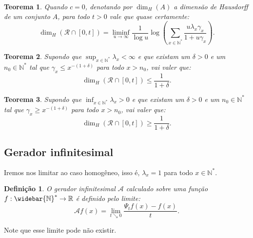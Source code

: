 \documentclass[xcolor=pdftex,dvipsnames]{beamer}
\newcommand{\AAA}{{\mathcal{A}}}
\newcommand{\RR}{{\mathcal{R}}}
\newcommand{\Nz}{{\mathbb{N^*}}}
\newcommand{\Nzb}{{\mathbb{\widebar{N}^*}}}
\newcommand{\R}{{\mathbb{R}}}
\newtheorem{teorema}{Teorema}
\newtheorem{definicao}{Definição}
\begin{document}
\begin{frame}
  \begin{teorema}
    Quando $c = 0$, denotando por $\dim_H (A)$ a dimensão de Hausdorff
    de um conjunto $A$, para todo $t > 0$ vale que quase certamente:
    \begin{displaymath}
      \dim_H(\RR \cap [0, t]) = 
      \liminf_{u \to \infty} 
      \frac{1}{\log u} \log \left(
        \sum_{x \in \Nz} \frac{u \lambda_x \gamma_x}{1 + u\gamma_x}
      \right).
    \end{displaymath}
  \end{teorema}
\end{frame}

\begin{frame}

  \begin{teorema}
    Supondo que $\sup_{x\in\Nz}\lambda_x < \infty$ e que existam um
    $\delta>0$ e um $n_0 \in \Nz$ tal que $\gamma_x \leq
    x^{-(1+\delta)}$ para todo $x > n_0$, vai valer que:
    \begin{displaymath}
      \dim_H(\RR \cap [0, t]) \leq \frac{1}{1+\delta} .
    \end{displaymath}
  \end{teorema}

  \begin{teorema}
    Supondo que $\inf_{x\in\Nz}\lambda_x > 0$ e que existam um
    $\delta>0$ e um $n_0 \in \Nz$ tal que $\gamma_x \geq
    x^{-(1+\delta)}$ para todo $x > n_0$, vai valer que:
    \begin{displaymath}
      \dim_H(\RR \cap [0, t]) \geq \frac{1}{1+\delta} .
    \end{displaymath}
  \end{teorema}
\end{frame}

\subsection{Gerador infinitesimal}

\begin{frame}

  Iremos nos limitar ao caso homogêneo, isso é, $\lambda_x = 1$ para
  todo $x \in \Nz$.

  \begin{definicao}
    O gerador infinitesimal $\AAA$ calculado sobre uma função $f: \Nzb
    \to \R$ é definido pelo limite:
    \begin{displaymath}
      \AAA f (x) = \lim_{t \searrow 0} \frac{\Psi_t f (x) - f(x)}{t}.
    \end{displaymath}
  \end{definicao}
  
  Note que esse limite pode não existir.

\end{frame}  
\end{document}
